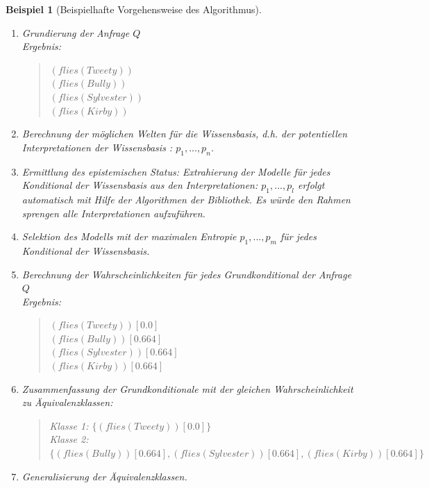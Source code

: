 \documentclass[a4paper, 11pt]{book}
\newtheorem{Bsp}{Beispiel}[section]
\begin{document}
\begin{Bsp}[Beispielhafte Vorgehensweise des Algorithmus]
\begin{enumerate}
		\item Grundierung der Anfrage $ Q $\\
		Ergebnis:
		\begin{quote}
			$ (flies(Tweety))$\\
			$ (flies(Bully))$\\
			$ (flies(Sylvester))$\\
			$ (flies(Kirby))$\\
		\end{quote}
		\item Berechnung der möglichen Welten für die Wissensbasis, d.h. der potentiellen Interpretationen der Wissensbasis : $ p_1, ..., p_n $.
		\item Ermittlung des epistemischen Status: Extrahierung der Modelle für jedes Konditional der Wissensbasis aus den Interpretationen: $ p_1, ..., p_l $ erfolgt automatisch mit Hilfe der Algorithmen der Bibliothek. Es würde den Rahmen sprengen alle Interpretationen aufzuführen.\\
		\item Selektion des Modells mit der maximalen Entropie $p_1, ..., p_m$ für jedes Konditional der Wissensbasis.
		\item Berechnung der Wahrscheinlichkeiten für jedes Grundkonditional der Anfrage $ Q $\\
		Ergebnis:
		\begin{quote}
			$(flies(Tweety))[0.0]$\\
			$(flies(Bully))[0.664]$\\
			$(flies(Sylvester))[0.664]$\\
			$(flies(Kirby))[0.664]$
		\end{quote}
		\item Zusammenfassung der Grundkonditionale mit der gleichen Wahrscheinlichkeit zu Äquivalenzklassen:
		
		\begin{quote}
			Klasse 1: $\{(flies(Tweety))[0.0]\}$\\
			Klasse 2: $\{(flies(Bully))[0.664], (flies(Sylvester))[0.664], (flies(Kirby))[0.664]\}$
		\end{quote}
		
		\item Generalisierung der Äquivalenzklassen.  
		\begin{quote}
			

\end{quote}
\end{enumerate}
\end{Bsp}
\end{document}
